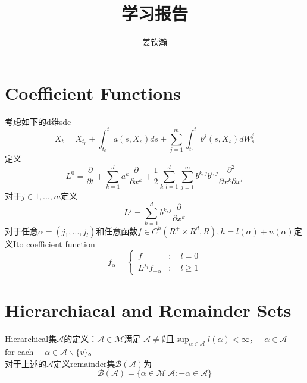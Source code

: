 \documentclass{article}%
\title{学习报告}
\author{姜钦瀚}
\begin{document}
	\maketitle
	\section{Coefficient Functions}
	考虑如下的d维sde
	\begin{equation}
	X_{t}=X_{t_{0}}+\int_{t_{0}}^{t} a\left(s, X_{s}\right) d s+\sum_{j=1}^{m} \int_{t_{0}}^{t} b^{j}\left(s, X_{s}\right) d W_{s}^{j}
	\end{equation}
	定义
	\begin{equation}
	L^{0}=\frac{\partial}{\partial t}+\sum_{k=1}^{d} a^{k} \frac{\partial}{\partial x^{k}}+\frac{1}{2} \sum_{k, l=1}^{d} \sum_{j=1}^{m} b^{k, j} b^{l, j} \frac{\partial^{2}}{\partial x^{k} \partial x^{l}}
	\end{equation}
	对于$j\in{1,...,m}$定义
	\begin{equation}
	L^{j}=\sum_{k=1}^{d} b^{k, j} \frac{\partial}{\partial x^{k}}
	\end{equation}
	对于任意$\alpha=(j_1,...,j_l)$和任意函数$f\in C^h(R^+\times R^d,R),h=l(\alpha)+n(\alpha)$定义Ito coefficient function
	\begin{equation}
	f_{\alpha}=\left\{\begin{array}{ll}
	f & : \quad l=0 \\
	L^{j_{1}} f_{-\alpha} & : \quad l \geq 1
	\end{array}\right.
	\end{equation}
	\section{Hierarchiacal and Remainder Sets}
	Hierarchical集$\mathcal{A}$的定义：$\mathcal{A}\in\mathcal{M}$满足
$\mathcal{A} \neq \emptyset$且$\sup _{\alpha \in \mathcal{A}} l(\alpha)<\infty$，$-\alpha \in \mathcal{A} \quad$ for each $\quad \alpha \in \mathcal{A} \backslash\{v\}$。
\\
对于上述的$\mathcal{A}$定义remainder集$\mathcal{B}(\mathcal{A})$为
$$\mathcal{B}(\mathcal{A})=\{\alpha \in \mathcal{M}\ \mathcal{A}:-\alpha \in \mathcal{A}\}$$
\end{document}
